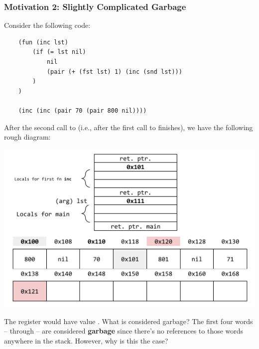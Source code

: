 \documentclass[letterpaper]{article}
\begin{document}
\subsubsection{Motivation 2: Slightly Complicated Garbage}
Consider the following code: 
\begin{verbatim}
    (fun (inc lst)
        (if (= lst nil)
            nil 
            (pair (+ (fst lst) 1) (inc (snd lst)))
        )
    )

    (inc (inc (pair 70 (pair 800 nil))))\end{verbatim}

After the second call to  (i.e., after the first call to  finishes), we have the following rough diagram:
\begin{center}
    \includegraphics[scale=0.7]{../assets/stackHeapPairGC2.png}
\end{center}
The register  would have value . What is considered garbage? The first four words --  through  -- are considered \textbf{garbage} since there's no references to those words anywhere in the stack. However, why is this the case?  
\end{document}
